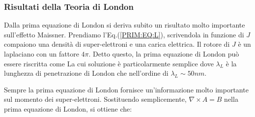 \subsubsection{Risultati della Teoria di London}
Dalla prima equazione di London si deriva subito un risultato molto importante sull'effetto Maissner. Prendiamo l'Eq.(\ref{PRIM:EQ:L}), scrivendola in funzione di $J$ compaiono una densit\`a di super-elettroni e una carica elettrica. Il rotore di $J$ \`e un laplaciano con un fattore $4\pi$. Detto questo, la prima equazione di London pu\`o essere riscritta come
La cui soluzione \`e particolarmente semplice
dove $\lambda_L$ \`e la lunghezza di penetrazione di London che nell'ordine di $\lambda_L\sim50nm$.

Sempre la prima equazione di London fornisce un'informazione molto importante sul momento dei super-elettroni. Sostituendo semplicemente, $\nabla \times A = B$ nella prima equazione di London, si ottiene che:















